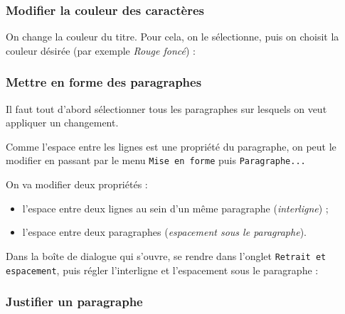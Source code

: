 \subsubsection{Modifier la couleur des caractères} 


On change la couleur du titre. Pour cela, on le sélectionne, puis on choisit la couleur désirée (par exemple \emph{Rouge foncé}) :











\subsubsection{Mettre en forme des paragraphes} 



Il faut tout d'abord sélectionner tous les paragraphes sur lesquels on veut appliquer un changement.

Comme l'espace entre les lignes est une propriété du paragraphe, on peut le modifier en passant par le menu \texttt{Mise en forme} puis \texttt{Paragraphe...}

On va modifier deux propriétés : 
\begin{itemize}
\item l'espace entre deux lignes au sein d'un même paragraphe (\emph{interligne}) ;
\item l'espace entre deux paragraphes (\emph{espacement sous le paragraphe}).
\end{itemize}



Dans la boîte de dialogue qui s'ouvre, se rendre dans l'onglet \texttt{Retrait et espacement}, puis régler l'interligne et l'espacement sous le paragraphe :  








\subsubsection{Justifier un paragraphe}

